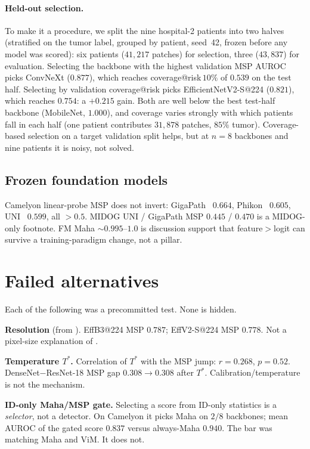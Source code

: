 \documentclass[anon]{midl}
\begin{document}
\paragraph{Held-out selection.}
To make it a procedure, we split the nine hospital-2 patients into two halves (stratified on the tumor label, grouped by patient, seed~42, frozen before any model was scored): six patients ($41{,}217$ patches) for selection, three ($43{,}837$) for evaluation.
Selecting the backbone with the highest validation MSP AUROC picks ConvNeXt ($0.877$), which reaches coverage@risk\,$10\%$ of $0.539$ on the test half.
Selecting by validation coverage@risk picks EfficientNetV2-S@224 ($0.821$), which reaches $0.754$: a $+0.215$ gain.
Both are well below the best test-half backbone (MobileNet, $1.000$), and coverage varies strongly with which patients fall in each half (one patient contributes $31{,}878$ patches, $85\%$ tumor).
Coverage-based selection on a target validation split helps, but at $n{=}8$ backbones and nine patients it is noisy, not solved.

\subsection{Frozen foundation models}

Camelyon linear-probe MSP does not invert: GigaPath~\cite{xu2024gigapath} $0.664$, Phikon~\cite{filiot2023phikon} $0.605$, UNI~\cite{chen2024uni} $0.599$, all ${>}0.5$.
MIDOG UNI / GigaPath MSP $0.445$ / $0.470$ is a MIDOG-only footnote.
FM Maha ${\sim}0.995$--$1.0$ is discussion support that feature${>}$logit can survive a training-paradigm change, not a pillar.

\section{Failed alternatives}
\label{sec:failed}

Each of the following was a precommitted test. None is hidden.

\textbf{Resolution} (from ).
EffB3@224 MSP $0.787$; EffV2-S@224 MSP $0.778$.
Not a pixel-size explanation of .

\textbf{Temperature $T^\ast$.}
Correlation of $T^\ast$ with the MSP jump: $r{=}0.268$, $p{=}0.52$.
DenseNet${-}$ResNet-18 MSP gap $0.308{\to}0.308$ after $T^\ast$.
Calibration/temperature is not the mechanism.

\textbf{ID-only Maha/MSP gate.}
Selecting a score from ID-only statistics is a \emph{selector}, not a detector.
On Camelyon it picks Maha on $2/8$ backbones; mean AUROC of the gated score $0.837$ versus always-Maha $0.940$.
The bar was matching Maha and ViM. It does not.
\end{document}
